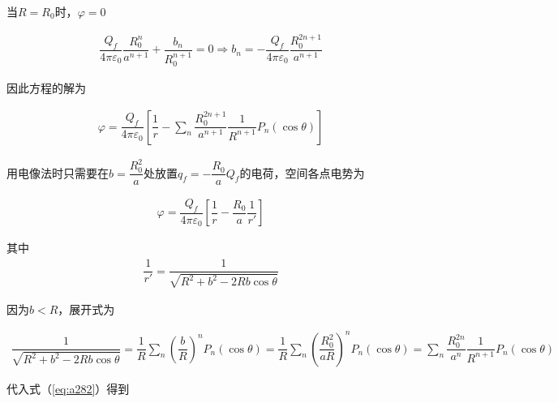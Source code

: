 \documentclass{article}
\begin{document}
当$R=R_0$时，$\varphi =0$

\begin{equation*}
  \begin{aligned}
    \dfrac{Q_f}{4 \pi \varepsilon_0} \dfrac{R_0^n}{a^{n+1}} + \dfrac{b_n}{R_0^{n+1}} = 0
    \Rightarrow
    b_n = - \dfrac{Q_f}{4 \pi \varepsilon_0} \dfrac{R_0^{2n+1}}{a^{n+1}}
  \end{aligned}
\end{equation*}

因此方程的解为

\begin{equation}
  \label{eq:a281}
  \begin{aligned}
    \varphi = \dfrac{Q_f}{4 \pi \varepsilon_0} \left[ \dfrac{1}{r}  - \sum_n \dfrac{R_0^{2n+1}}{a^{n+1}} \dfrac{1}{R^{n+1}} P_n \left( \cos \theta \right) \right]
  \end{aligned}
\end{equation}

用电像法时只需要在$b=\dfrac{R_0^2}{a} $处放置$q_f=-\dfrac{R_0}{a} Q_f $的电荷，空间各点电势为

\begin{equation}
  \label{eq:a282}
  \begin{aligned}
    \varphi = \dfrac{Q_f}{4\pi \varepsilon_0} \left[ \dfrac{1}{r} - \dfrac{R_0}{a} \dfrac{1}{r'}    \right] 
  \end{aligned}
\end{equation}

其中
\begin{equation*}
  \begin{aligned}
    \dfrac{1}{r'} = \dfrac{1}{\sqrt{R^2 + b^2 - 2 R b \cos \theta}}
  \end{aligned}
\end{equation*}

因为$b<R$，展开式为


\begin{equation*}
  \begin{aligned}
    \dfrac{1}{\sqrt{R^2 + b^2 - 2 R b \cos \theta}} =
    \dfrac{1}{R} \sum _n \left( \dfrac{b}{R}  \right)^n P_n \left( \cos \theta \right) 
    = \dfrac{1}{R} \sum _n \left( \dfrac{R_0^2}{aR}  \right)^n P_n \left( \cos \theta \right)
    = \sum_n \dfrac{R_0^{2n}}{a^n} \dfrac{1}{R^{n+1}} P_n \left( \cos \theta \right)
  \end{aligned}
\end{equation*}

代入式（\ref{eq:a282}）得到
\end{document}
